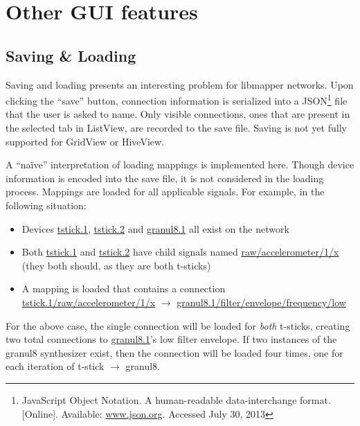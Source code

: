 

\section{Other GUI features} %
\label{sec:other_gui_features}

	\subsection{Saving \& Loading} %
	\label{sec:saving_and_loading}

Saving and loading presents an interesting problem for libmapper networks. Upon clicking the ``save'' button, connection information is serialized into a JSON\footnote{JavaScript Object Notation. A human-readable data-interchange format. [Online]. Available: \url{www.json.org}. Accessed July 30, 2013} file that the user is asked to name. Only visible connections, ones that are present in the selected tab in ListView, are recorded to the save file. Saving is not yet fully supported for GridView or HiveView.

A ``na\"{i}ve'' interpretation of loading mappings is implemented here. Though device information is encoded into the save file, it is not considered in the loading process. Mappings are loaded for all applicable signals. For example, in the following situation:

\begin{itemize}
	\item Devices \url{tstick.1}, \url{tstick.2} and \url{granul8.1} all exist on the network
	\item Both \url{tstick.1} and \url{tstick.2} have child signals named \url{raw/accelerometer/1/x} (they both should, as they are both t-sticks)
	\item A mapping is loaded that contains a connection \url{tstick.1/raw/accelerometer/1/x} $\rightarrow$ \url{granul8.1/filter/envelope/frequency/low}
\end{itemize}

For the above case, the single connection will be loaded for \emph{both} t-sticks, creating two total connections to \url{granul8.1}'s low filter envelope. If two instances of the granul8 synthesizer exist, then the connection will be loaded four times, one for each iteration of t-stick $\rightarrow$ granul8.

